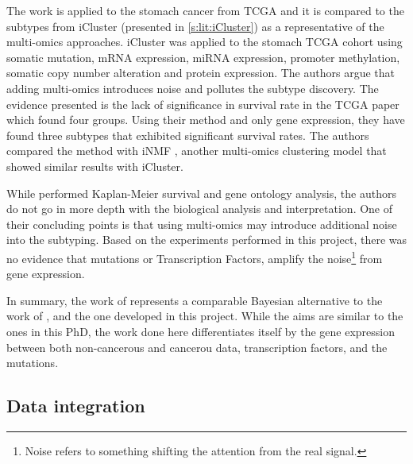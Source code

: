 The work is applied to the stomach cancer from TCGA and it is compared to the subtypes from iCluster \citet{Shen2009-ew} (presented in \cref{s:lit:iCluster}) as a representative of the multi-omics approaches. iCluster was applied to the stomach TCGA cohort \cite{Cancer_Genome_Atlas_Research_Network2014-xp} using somatic mutation, mRNA expression, miRNA expression, promoter methylation, somatic copy number alteration and protein expression. The authors \citet{Nakazawa2021-yq} argue that adding multi-omics introduces noise and pollutes the subtype discovery. The evidence presented is the lack of significance in survival rate in the TCGA paper \citet{Cancer_Genome_Atlas_Research_Network2014-xp} which found four groups. Using their method and only gene expression, they have found three subtypes that exhibited significant survival rates. The authors compared the method with iNMF \citet{Yang2016-dm}, another multi-omics clustering model that showed similar results with iCluster.

While \cite{Nakazawa2021-yq} performed Kaplan-Meier survival and gene ontology analysis, the authors do not go in more depth with the biological analysis and interpretation. One of their concluding points is that using multi-omics may introduce additional noise into the subtyping. Based on the experiments performed in this project, there was no evidence that mutations or Transcription Factors, amplify the noise\footnote{Noise refers to something shifting the attention from the real signal.} from gene expression. 

In summary, the work of \citet{Nakazawa2021-yq} represents a comparable Bayesian alternative to the work of \citet{Care2019-ij}, and the one developed in this project. While the aims are similar to the ones in this PhD, the work done here differentiates itself by the gene expression between both non-cancerous and cancerou data, transcription factors, and the mutations.




\subsection{Data integration} \label{s:lit:net_data_int}

\vspace{3mm}
\vspace{3mm}


